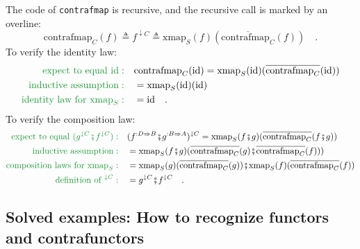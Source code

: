 The code of \lstinline!contrafmap! is recursive, and the recursive
call is marked by an overline: 
\[
\text{contrafmap}_{C}(f)\triangleq f^{\downarrow C}\triangleq\text{xmap}_{S}(f)(\overline{\text{contrafmap}_{C}}(f))\quad.
\]
To verify the identity law:
\begin{align*}
{\color{greenunder}\text{expect to equal }\text{id}:}\quad & \text{contrafmap}_{C}(\text{id})=\text{xmap}_{S}(\text{id})(\overline{\text{contrafmap}_{C}}(\text{id}))\\
{\color{greenunder}\text{inductive assumption}:}\quad & =\text{xmap}_{S}(\text{id})(\text{id})\\
{\color{greenunder}\text{identity law for }\text{xmap}_{S}:}\quad & =\text{id}\quad.
\end{align*}
To verify the composition law:
\begin{align*}
{\color{greenunder}\text{expect to equal }(g^{\downarrow C}\bef f^{\downarrow C}):}\quad & (f^{:D\Rightarrow B}\bef g^{:B\Rightarrow A})^{\downarrow C}=\text{xmap}_{S}(f\bef g)(\overline{\text{contrafmap}_{C}}(f\bef g))\\
{\color{greenunder}\text{inductive assumption}:}\quad & =\text{xmap}_{S}(f\bef g)(\overline{\text{contrafmap}_{C}}(g)\bef\overline{\text{contrafmap}_{C}}(f)))\\
{\color{greenunder}\text{composition laws for }\text{xmap}_{S}:}\quad & =\text{xmap}_{S}(g)(\overline{\text{contrafmap}_{C}}(g))\bef\text{xmap}_{S}(f)(\overline{\text{contrafmap}_{C}}(f))\\
{\color{greenunder}\text{definition of }^{\downarrow C}:}\quad & =g^{\downarrow C}\bef f^{\downarrow C}\quad.
\end{align*}


\subsection{Solved examples: How to recognize functors and contrafunctors\label{subsec:Solved-examples:-How-to-recognize-functors}}

